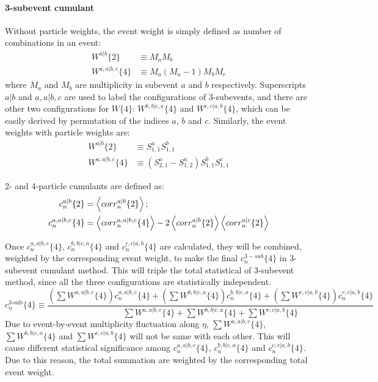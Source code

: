 \paragraph{3-subevent cumulant}
Without particle weights, the event weight is simply defined as number of combinations in an event:
\begin{equation}
\begin{split}
W^{a|b}\{2\}&\equiv M_{a}M_{b} \\
W^{a,a|b,c}\{4\}&\equiv M_{a}(M_{a}-1)M_{b}M_{c}
\end{split}
\end{equation}
where $M_{a}$ and $M_{b}$ are multiplicity in subevent $a$ and $b$ respectively. Superscripts $a|b$ and $a,a|b,c$ are used to label the configurations of 3-subevents, and there are other two configurations for $W\{4\}$: $W^{b,b|c,a}\{4\}$ and $W^{c,c|a,b}\{4\}$, which can be easily derived by permutation of the indices $a$, $b$ and $c$.
Similarly, the event weights with particle weights are:
\begin{equation}
\begin{split}
W^{a|b}\{2\}&\equiv S_{1,1}^a S_{1,1}^b \\
W^{a,a|b,c}\{4\}&\equiv (S_{2,1}^a-S_{1,2}^a)S_{1,1}^b S_{1,1}^c
\end{split}
\end{equation}

2- and 4-particle cumulants are defined as:
\begin{equation}
\begin{split}
c_n^{a|b}\{2\}&= \left\langle corr_n^{a|b}\{2\}\right\rangle; \\
c_n^{a,a|b,c}\{4\}&= \left\langle corr_n^{a,a|b,c}\{4\}\right\rangle-2\left\langle corr_n^{a|b}\{2\}\right\rangle\left\langle corr_n^{a|c}\{2\}\right\rangle
\end{split}
\end{equation}

Once $c_n^{a,a|b,c}\{4\}$, $c_n^{b,b|c,a}\{4\}$ and $c_n^{c,c|a,b}\{4\}$ are calculated, they will be combined, weighted by the corresponding event weight, to make the final $c_n^{3-sub}\{4\}$ in 3-subevent cumulant method. This will triple the total statistical of 3-subevent method, since all the three configurations are statistically independent.
\begin{equation}
c_n^{\text{3-sub}}\{4\} \equiv \frac{(\sum W^{a,a|b,c}\{4\}) c_n^{a,a|b,c}\{4\} + (\sum W^{b,b|c,a}\{4\}) c_n^{b,b|c,a}\{4\} + (\sum W^{c,c|a,b}\{4\}) c_n^{c,c|a,b}\{4\}}{\sum W^{a,a|b,c}\{4\} + \sum W^{b,b|c,a}\{4\} + \sum W^{c,c|a,b}\{4\}}
\end{equation}
Due to event-by-event multiplicity fluctuation along $\eta$, $\sum W^{a,a|b,c}\{4\}$, $\sum W^{b,b|c,a}\{4\}$ and $\sum W^{c,c|a,b}\{4\}$ will not be same with each other. This will cause different statistical significance among $c_n^{a,a|b,c}\{4\}$, $c_n^{b,b|c,a}\{4\}$ and $c_n^{c,c|a,b}\{4\}$. Due to this reason, the total summation are weighted by the corresponding total event weight.



